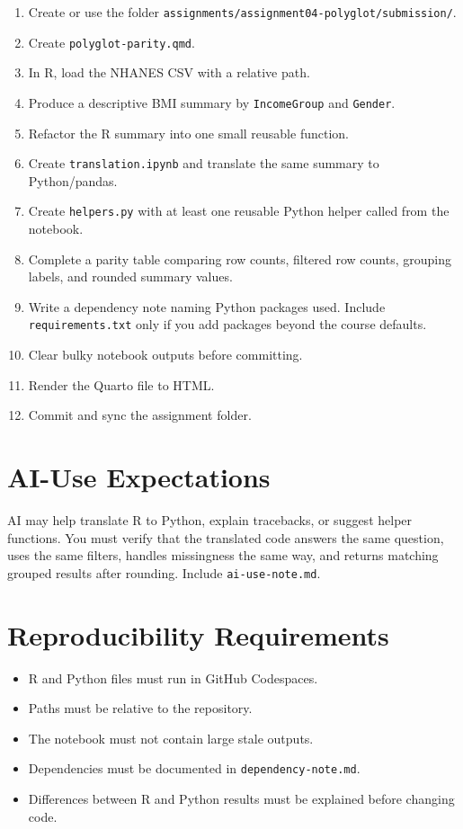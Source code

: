 \documentclass[
  letterpaper,
  DIV=11,
  numbers=noendperiod,
  oneside]{scrreprt}
\providecommand{\tightlist}{%
  \setlength{\itemsep}{0pt}\setlength{\parskip}{0pt}}
\begin{document}
\begin{enumerate}
\def\labelenumi{\arabic{enumi}.}
\tightlist
\item
  Create or use the folder
  \texttt{assignments/assignment04-polyglot/submission/}.
\item
  Create \texttt{polyglot-parity.qmd}.
\item
  In R, load the NHANES CSV with a relative path.
\item
  Produce a descriptive BMI summary by \texttt{IncomeGroup} and
  \texttt{Gender}.
\item
  Refactor the R summary into one small reusable function.
\item
  Create \texttt{translation.ipynb} and translate the same summary to
  Python/pandas.
\item
  Create \texttt{helpers.py} with at least one reusable Python helper
  called from the notebook.
\item
  Complete a parity table comparing row counts, filtered row counts,
  grouping labels, and rounded summary values.
\item
  Write a dependency note naming Python packages used. Include
  \texttt{requirements.txt} only if you add packages beyond the course
  defaults.
\item
  Clear bulky notebook outputs before committing.
\item
  Render the Quarto file to HTML.
\item
  Commit and sync the assignment folder.
\end{enumerate}

\section{AI-Use Expectations}\label{ai-use-expectations-3}

AI may help translate R to Python, explain tracebacks, or suggest helper
functions. You must verify that the translated code answers the same
question, uses the same filters, handles missingness the same way, and
returns matching grouped results after rounding. Include
\texttt{ai-use-note.md}.

\section{Reproducibility
Requirements}\label{reproducibility-requirements-3}

\begin{itemize}
\tightlist
\item
  R and Python files must run in GitHub Codespaces.
\item
  Paths must be relative to the repository.
\item
  The notebook must not contain large stale outputs.
\item
  Dependencies must be documented in \texttt{dependency-note.md}.
\item
  Differences between R and Python results must be explained before
  changing code.
\end{itemize}
\end{document}
